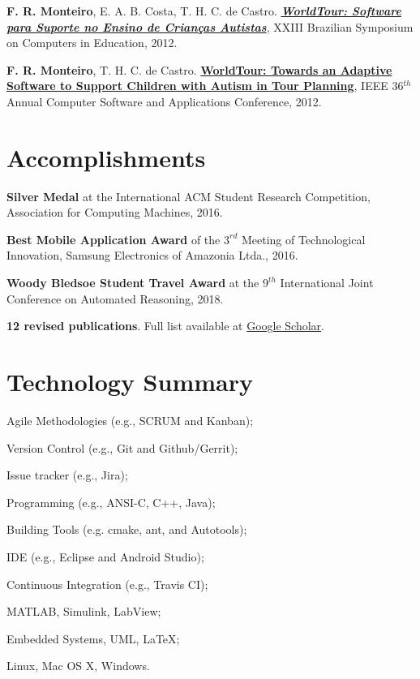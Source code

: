\documentclass[letterpaper]{article}
\renewenvironment{itemize}{
  \begin{list}{}{
    \setlength{\leftmargin}{1.5em}
  }
}{
  \end{list}
}
\begin{document}
\begin{itemize}
    \item {\bf F. R. Monteiro}, E. A. B. Costa, T. H. C. de Castro. \href{http://www.br-ie.org/pub/index.php/sbie/article/view/1806}{{\bf {\it WorldTour: Software para Suporte no Ensino de Crianças Autistas}}},
  XXIII Brazilian Symposium on Computers in Education, 2012.
    
    \item {\bf F. R. Monteiro}, T. H. C. de Castro. \href{http://ieeexplore.ieee.org/abstract/document/6340181/}{{\bf WorldTour: Towards an Adaptive Software to Support Children with Autism in Tour Planning}},
  IEEE 36$^{th}$ Annual Computer Software and Applications Conference, 2012.

\end{itemize}

\section*{Accomplishments}
\begin{itemize}
  \item {\bf Silver Medal} at the International ACM Student Research Competition, Association for Computing Machines, 2016.

  \item {\bf Best Mobile Application Award} of the $3^{rd}$ Meeting of Technological Innovation, Samsung Electronics of Amazonia Ltda., 2016.
  
  \item {\bf Woody Bledsoe Student Travel Award} at the $9^{th}$ International Joint Conference on Automated Reasoning, 2018.

  \item {\bf 12 revised publications}. Full list available at \href{https://scholar.google.com/citations?hl=en&user=6bNQcz0AAAAJ}{Google Scholar}.
\end{itemize}

\section*{Technology Summary}
   \begin{itemize}
   \item{Agile Methodologies (e.g., SCRUM and Kanban);}
   \item{Version Control (e.g., Git and Github/Gerrit);}
   \item{Issue tracker (e.g., Jira);}
   \item{Programming (e.g., ANSI-C, C++, Java);}
   \item{Building Tools (e.g. cmake, ant, and Autotools);}
   \item{IDE (e.g., Eclipse and Android Studio);}
   \item{Continuous Integration (e.g., Travis CI);}
   \item{MATLAB, Simulink, LabView;}
   \item{Embedded Systems, UML, \LaTeX;}
   \item{Linux, Mac OS X, Windows.}
   \end{itemize}
   
\end{document}
